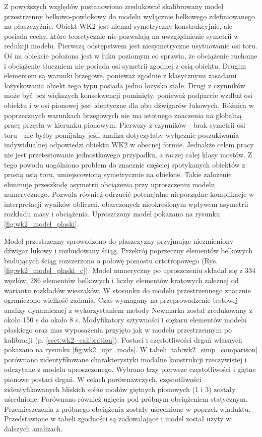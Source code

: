Z powyższych względów postanowiono zredukować skalibrowany model przestrzenny belkowo-powłokowy do modelu wyłącznie belkowego zdefiniowanego na płaszczyźnie. Obiekt WK2 jest niemal symetryczny konstrukcyjnie, ale posiada cechy, które teoretycznie nie pozwalają na uwzględnienie symetrii w redukcji modelu. Pierwszą odstępstwem jest niesymetryczne usytuowanie osi toru. Oś na obiekcie położona jest w łuku poziomym co sprawia, że obciążenie ruchome i obciążenie tłuczniem nie posiada osi symetrii zgodnej z osią obiektu. Drugim elementem są warunki brzegowe, ponieważ zgodnie z klasycznymi zasadami łożyskowania obiekt tego typu posiada jedno łożysko stałe. Drugi z czynników może być bez większych konsekwencji pominięty, ponieważ podparcie wzdłuż osi obiektu i w osi pionowej jest identyczne dla obu dźwigarów łukowych. Różnica w poprzecznych warunkach brzegowych nie ma istotnego znaczenia na globalną pracę przęsła w kierunku pionowym. Pierwszy z czynników - brak symetrii osi toru - nie byłby pomijalny jeśli analiza dotyczyłaby wyłącznie poszukiwania indywidualnej odpowiedzi obiektu WK2 w obecnej formie. Jednakże celem pracy nie jest przetestowanie jednostkowego przypadku, a raczej całej klasy mostów. Z tego powodu uogólniono problem do znacznie częściej spotykanych obiektów z prostą osią toru, umiejscowioną symetrycznie na obiekcie. Takie założenie eliminuje przeszkodę asymetrii obciążenia przy uproszczeniu modelu numerycznego. Pozwala również odrzucić potencjalne nieporządne komplikacje w interpretacji wyników obliczeń, obarczonych nieokreślonym wpływem asymetrii rozkładu masy i obciążenia. Uproszczony model pokazano na rysunku \ref{fig:wk2_model_plaski}.



Model przestrzenny sprowadzono do płaszczyzny przyjmując niezmieniony dźwigar łukowy i rozbudowany ściąg. Przekrój poprzeczny elementów belkowych budujących ściąg rozszerzono o połowę pomostu ortotropowego (Rys. \ref{fig:wk2_model_plaski_c}). Model numeryczny po uproszczeniu składał się z 334 węzłów, 286 elementów belkowych i liczby elementów kratowych zależnej od wariantu rozkładów wieszaków. W stosunku do modelu przestrzennego znacznie ograniczono wielkość zadania. Czas wymagany na przeprowadzenie testowej analizy dynamicznej z wykorzystaniem metody Newmarka został zredukowany z około 150 s do około 8 s. Modyfikatory sztywności i ciężaru elementów modelu płaskiego oraz mas wyposażenia przyjęto jak w modelu przestrzennym po kalibracji (p. \ref{sect:wk2_calibration}). Postaci i częstotliwości drgań własnych pokazano na rysunku \ref{fig:wk2_upr_mods}. W tabeli \ref{tab:wk2_simp_comparison} porównano zidentyfikowane charakterystyki modalne konstrukcji rzeczywistej i odczytane z modelu uproszczonego. Wybrano trzy pierwsze częstotliwości i giętne pionowe postaci drgań. W celach porównawczych, częstotliwości zidentyfikowanych bliskich sobie modów giętnych pionowych (1 i 3) zostały uśrednione. Porównano również ugięcia pod próbnym obciążeniem statycznym. Przemieszczenia z próbnego obciążenia zostały uśrednione w poprzek wiaduktu.
Przedstawione w tabeli zgodności są zadowalające i model został użyty w dalszych analizach.

